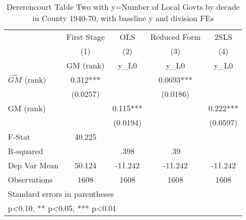 \begin{table}[htbp]\centering
\def\sym#1{\ifmmode^{#1}\else\(^{#1}\)\fi}
\caption{Dererencourt Table Two with y=Number of Local Govts by decade in County 1940-70, with baseline y and division FEs}
\begin{tabular}{l*{4}{c}}
\toprule
                    & First Stage   &         OLS   &Reduced Form   &        2SLS   \\
                    &\multicolumn{1}{c}{(1)}&\multicolumn{1}{c}{(2)}&\multicolumn{1}{c}{(3)}&\multicolumn{1}{c}{(4)}\\
                    &\multicolumn{1}{c}{GM  (rank)}&\multicolumn{1}{c}{y\_L0}&\multicolumn{1}{c}{y\_L0}&\multicolumn{1}{c}{y\_L0}\\
\midrule
$\hat{GM}$ (rank)   &       0.312***&               &      0.0693***&               \\
                    &    (0.0257)   &               &    (0.0186)   &               \\
\addlinespace
GM  (rank)          &               &       0.115***&               &       0.222***\\
                    &               &    (0.0194)   &               &    (0.0597)   \\
\midrule
F-Stat              &      40.225   &               &               &               \\
R-squared           &               &        .398   &         .39   &               \\
Dep Var Mean        &      50.124   &     -11.242   &     -11.242   &     -11.242   \\
Observations        &        1608   &        1608   &        1608   &        1608   \\
\bottomrule
\multicolumn{5}{l}{\footnotesize Standard errors in parentheses}\\
\multicolumn{5}{l}{\footnotesize * p<0.10, ** p<0.05, *** p<0.01}\\
\end{tabular}
\end{table}
